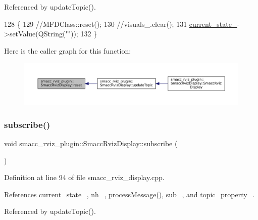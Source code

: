 Referenced by update\+Topic().


\begin{DoxyCode}
128 \{
129   \textcolor{comment}{//MFDClass::reset();}
130   \textcolor{comment}{//visuals\_.clear();}
131   \hyperlink{classsmacc__rviz__plugin_1_1SmaccRvizDisplay_a342ff238c1dfaa427f09ee205a9e92d5}{current\_state\_}->setValue(QString(\textcolor{stringliteral}{""}));
132 \}
\end{DoxyCode}
Here is the caller graph for this function\+:
\nopagebreak
\begin{figure}[H]
\begin{center}
\leavevmode
\includegraphics[width=350pt]{classsmacc__rviz__plugin_1_1SmaccRvizDisplay_af9cf4f5ef4f5fdb2fcb1bf1a81cdac4d_icgraph}
\end{center}
\end{figure}
\mbox{\label{classsmacc__rviz__plugin_1_1SmaccRvizDisplay_ad774027ba3eda277c991619332495cbb}} 
\subsubsection{\texorpdfstring{subscribe()}{subscribe()}}
{\footnotesize\ttfamily void smacc\+\_\+rviz\+\_\+plugin\+::\+Smacc\+Rviz\+Display\+::subscribe (\begin{DoxyParamCaption}{ }\end{DoxyParamCaption})\hspace{0.3cm}{\ttfamily [virtual]}}



Definition at line 94 of file smacc\+\_\+rviz\+\_\+display.\+cpp.



References current\+\_\+state\+\_\+, nh\+\_\+, process\+Message(), sub\+\_\+, and topic\+\_\+property\+\_\+.



Referenced by update\+Topic().


